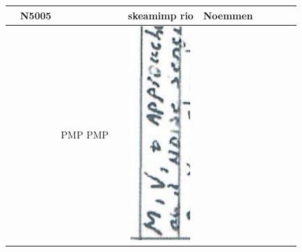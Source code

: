 \documentclass[10pt]{article}
\begin{document}
\begin{center}
\begin{tabular}{|c|c|c|c|c|c|c|c|c|c|}
 & N5005 &  &  & skeamimp rio & Noemmen &  &  &  &  \\
\hline
 &  & PMP PMP &  & \includegraphics[max width=\textwidth]{2025_02_27_dd68c3d38de88f0516d9g-070(1)}

\end{tabular}
\end{center}
\end{document}
